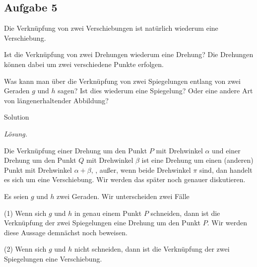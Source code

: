 \subsection*{Aufgabe 5}
Die Verkn\"upfung von zwei Verschiebungen ist nat\"urlich wiederum eine Verschiebung.
\bnal
\item Ist die Verkn\"upfung von zwei Drehungen wiederum eine Drehung? Die Drehungen k\"onnen dabei um zwei verschiedene Punkte erfolgen.
\item Was kann man \"uber die Verkn\"upfung von zwei Spiegelungen entlang von zwei Geraden $g$ und $h$ sagen? 
Ist dies wiederum eine Spiegelung? Oder eine andere Art von l\"angenerhaltender Abbildung?
\enm

\begin{taggedblock}{Solution}

\noindent \emph{L\"osung.}\mbox{}
\bnal
\item Die Verkn\"upfung einer Drehung um den Punkt $P$ mit Drehwinkel $\alpha$ und einer Drehung um den Punkt $Q$ mit Drehwinkel $\beta$ ist  eine Drehung um einen (anderen) Punkt mit Drehwinkel $\alpha+\beta$, , au\ss er, wenn beide Drehwinkel $\pi$ sind, dan handelt es sich um eine Verschiebung. Wir werden das sp\"ater noch genauer diskutieren.
\item Es seien $g$ und $h$ zwei Geraden. Wir unterscheiden zwei F\"alle
\bnm
\item[(1)] Wenn sich $g$ und $h$ in genau einem Punkt $P$ schneiden, dann ist die Verkn\"upfung der zwei Spiegelungen eine Drehung um den Punkt $P$. 
Wir werden diese Aussage demn\"achst noch beweisen. 
\item[(2)] Wenn sich $g$ und $h$ nicht schneiden, dann ist die Verkn\"upfung der zwei Spiegelungen eine Verschiebung.
\enm
\enm

\end{taggedblock}
